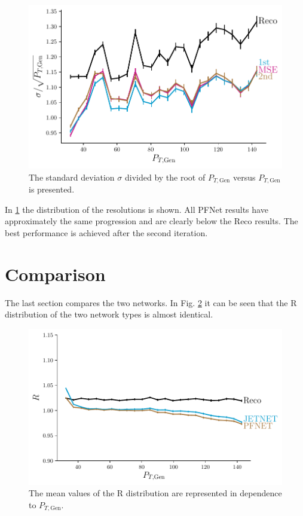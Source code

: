 \documentclass[12pt, a4paper]{thesis}
\begin{document}
\begin{figure}[hbtp]
  \centering
  \includegraphics[width=.9\linewidth]{../images/pfnet_res.pdf}
  \caption{The standard deviation $\sigma$ divided by the root of
    \(P_{T, \text{Gen}}\) versus \(P_{T, \text{Gen}}\) is presented.}
  \label{pfnet_res}
\end{figure} 

In \ref{pfnet_res} the distribution of the resolutions is shown. All
PFNet results have approximately the same progression and are clearly
below the Reco results. The best performance is achieved after the
second iteration.


\clearpage
\section{Comparison}
\label{sec:org638f190}

The last section compares the two networks. In Fig. \ref{comp_R} it
can be seen that the R distribution of the two network types is almost
identical.

\begin{figure}[hbtp]
  \centering
  \includegraphics[width=.9\linewidth]{../images/comp_R.pdf}
  \caption{The mean values of the R distribution are represented in
    dependence to \(P_{T, \text{Gen}}\).}
  \label{comp_R}
\end{figure}
\end{document}
